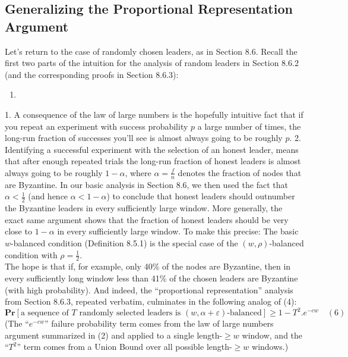 \subsection{Generalizing the Proportional Representation Argument}
Let’s return to the case of randomly chosen leaders, as in Section 8.6. Recall the first two
parts of the intuition for the analysis of random leaders in Section 8.6.2 (and the corresponding
proofs in Section 8.6.3):
\begin{enumerate}
    \item 
\end{enumerate}
1. A consequence of the law of large numbers is the hopefully intuitive fact that if you
repeat an experiment with success probability $p$ a large number of times, the long-run
fraction of successes you’ll see is almost always going to be roughly $p$.
2. Identifying a successful experiment with the selection of an honest leader, means
that after enough repeated trials the long-run fraction of honest leaders is almost
always going to be roughly $1 - \alpha$, where $\alpha = \frac{f}{n}$ denotes the fraction of nodes that
are Byzantine.
In our basic analysis in Section 8.6, we then used the fact that $\alpha < \frac{1}{2}$ (and hence $\alpha < 1 - \alpha$)
to conclude that honest leaders should outnumber the Byzantine leaders in every sufficiently
large window. More generally, the exact same argument shows that the fraction of honest
leaders should be very close to $1-\alpha$ in every sufficiently large window. To make this precise:
The basic $w$-balanced condition (Definition 8.5.1) is the special case of the $(w, \rho)$-balanced
condition with $\rho = \frac{1}{2}$.\\
The hope is that if, for example, only 40\% of the nodes are Byzantine, then in every
sufficiently long window less than 41\% of the chosen leaders are Byzantine (with high probability). And indeed, the “proportional representation” analysis from Section 8.6.3, repeated
verbatim, culminates in the following analog of (4):
$$\textbf{Pr}[\text{a sequence of $T$ randomly selected leaders is $(w, \alpha + \varepsilon)$-balanced}] \geq 1 - T^2 . e^{-cw}\quad (6)$$
(The “$e^{-cw}$” failure probability term comes from the law of large numbers argument summarized in (2) and applied to a single length-$\geq w$ window, and the “$T^2$” term comes from a
Union Bound over all possible length-$\geq w$ windows.)\\

